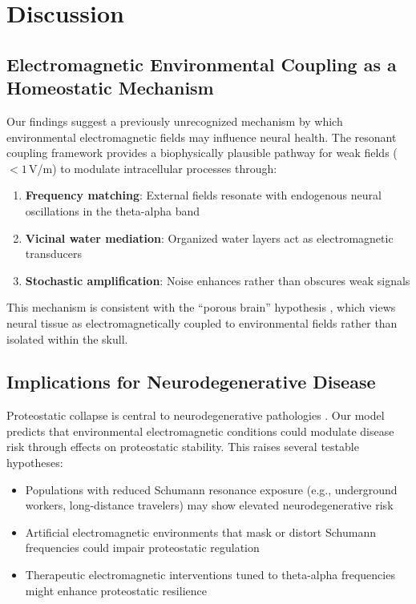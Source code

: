 \documentclass[10pt,a4paper]{article}
\begin{document}
\section{Discussion}

\subsection{Electromagnetic Environmental Coupling as a Homeostatic Mechanism}

Our findings suggest a previously unrecognized mechanism by which environmental 
electromagnetic fields may influence neural health. The resonant coupling framework 
provides a biophysically plausible pathway for weak fields ($< 1$\,V/m) to modulate 
intracellular processes through:

\begin{enumerate}
    \item \textbf{Frequency matching}: External fields resonate with endogenous neural 
    oscillations in the theta-alpha band
    \item \textbf{Vicinal water mediation}: Organized water layers act as electromagnetic 
    transducers
    \item \textbf{Stochastic amplification}: Noise enhances rather than obscures weak signals
\end{enumerate}

This mechanism is consistent with the ``porous brain'' hypothesis \citep{cavaglia2023porous, 
firaux2024dynamic}, which views neural tissue as electromagnetically coupled to 
environmental fields rather than isolated within the skull.

\subsection{Implications for Neurodegenerative Disease}

Proteostatic collapse is central to neurodegenerative pathologies \citep{hipp2019proteostasis, 
soto2012protein}. Our model predicts that environmental electromagnetic conditions 
could modulate disease risk through effects on proteostatic stability. This raises 
several testable hypotheses:

\begin{itemize}
    \item Populations with reduced Schumann resonance exposure (e.g., underground workers, 
    long-distance travelers) may show elevated neurodegenerative risk
    \item Artificial electromagnetic environments that mask or distort Schumann frequencies 
    could impair proteostatic regulation
    \item Therapeutic electromagnetic interventions tuned to theta-alpha frequencies 
    might enhance proteostatic resilience
\end{itemize}
\end{document}
